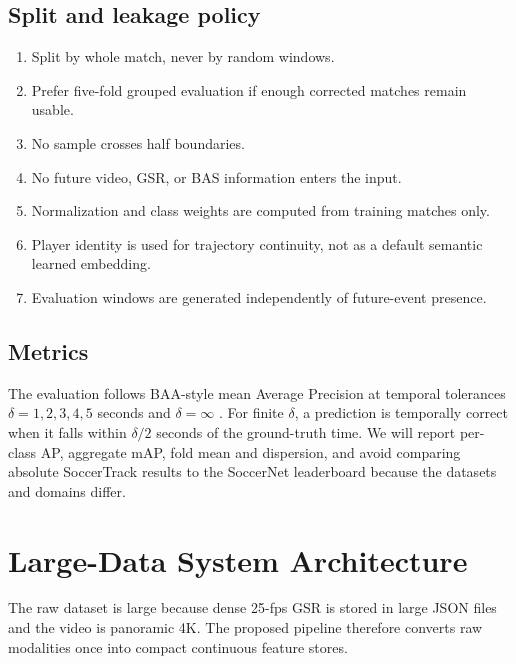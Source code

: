 \documentclass[11pt,a4paper]{article}
\begin{document}
\subsection{Split and leakage policy}
\begin{enumerate}
  \item Split by whole match, never by random windows.
  \item Prefer five-fold grouped evaluation if enough corrected matches remain usable.
  \item No sample crosses half boundaries.
  \item No future video, GSR, or BAS information enters the input.
  \item Normalization and class weights are computed from training matches only.
  \item Player identity is used for trajectory continuity, not as a default semantic learned embedding.
  \item Evaluation windows are generated independently of future-event presence.
\end{enumerate}

\subsection{Metrics}
The evaluation follows BAA-style mean Average Precision at temporal tolerances $\delta=1,2,3,4,5$ seconds and $\delta=\infty$ \citep{dalal2025faantra,cioppa2026soccernet}. For finite $\delta$, a prediction is temporally correct when it falls within $\delta/2$ seconds of the ground-truth time. We will report per-class AP, aggregate mAP, fold mean and dispersion, and avoid comparing absolute SoccerTrack results to the SoccerNet leaderboard because the datasets and domains differ.

\section{Large-Data System Architecture}
The raw dataset is large because dense 25-fps GSR is stored in large JSON files and the video is panoramic 4K. The proposed pipeline therefore converts raw modalities once into compact continuous feature stores.
\end{document}
